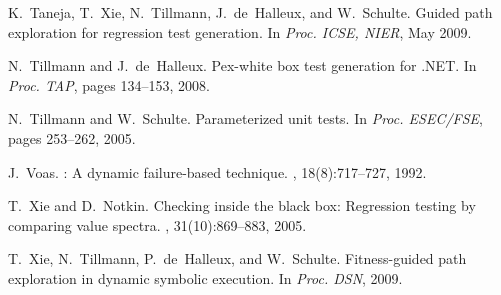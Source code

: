 \documentclass{sig-alternate}
\begin{document}
\begin{thebibliography}{10}
\begin{scriptsize}
K.~Taneja, T.~Xie, N.~Tillmann, J.~de~Halleux, and W.~Schulte.
\newblock Guided path exploration for regression test generation.
\newblock In {\em Proc. ICSE, NIER}, May 2009.

N.~Tillmann and J.~de~Halleux.
\newblock Pex-white box test generation for {.{N}{E}{T}}.
\newblock In {\em Proc. TAP}, pages 134--153, 2008.

N.~Tillmann and W.~Schulte.
\newblock Parameterized unit tests.
\newblock In {\em Proc. ESEC/FSE}, pages 253--262, 2005.

J.~Voas.
: A dynamic failure-based technique.
, 18(8):717--727, 1992.

T.~Xie and D.~Notkin.
\newblock Checking inside the black box: Regression testing by comparing value
  spectra.
, 31(10):869--883, 2005.

T.~Xie, N.~Tillmann, P.~de~Halleux, and W.~Schulte.
\newblock Fitness-guided path exploration in dynamic symbolic execution.
\newblock In {\em Proc. DSN}, 2009.

\end{scriptsize}
\end{thebibliography}
\end{document}
